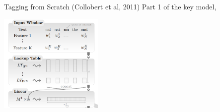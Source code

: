 \documentclass{beamer}
\begin{document}
\begin{frame}{Tagging from Scratch (Collobert et al, 2011)}
  Part 1 of the key model,
  \begin{center}
    \includegraphics[width=5cm]{cwlin}
  \end{center}
\end{frame}







\end{document}
